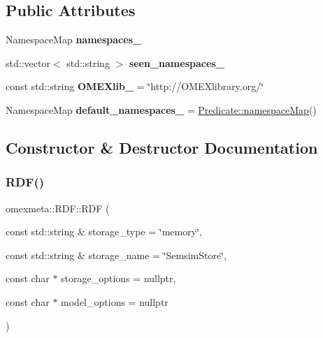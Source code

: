 \subsection*{Public Attributes}
\begin{DoxyCompactItemize}
\item 
\mbox{\label{classomexmeta_1_1RDF_a1979d7d70a4c20f2e63f00c7fa668b1f}} 
Namespace\+Map {\bfseries namespaces\+\_\+}
\item 
\mbox{\label{classomexmeta_1_1RDF_a82bc53feb93e1243970400fd104174da}} 
std\+::vector$<$ std\+::string $>$ {\bfseries seen\+\_\+namespaces\+\_\+}
\item 
\mbox{\label{classomexmeta_1_1RDF_a59014bbb45a43dbfa760480f1713c473}} 
const std\+::string {\bfseries O\+M\+E\+Xlib\+\_\+} = \char`\"{}http\+://O\+M\+E\+Xlibrary.\+org/\char`\"{}
\item 
\mbox{\label{classomexmeta_1_1RDF_a5b1184955f2401c30116c7473be1ca1d}} 
Namespace\+Map {\bfseries default\+\_\+namespaces\+\_\+} = \hyperlink{classomexmeta_1_1Predicate_a1291e3cd9727871f568e864e0f5af3f0}{Predicate\+::namespace\+Map}()
\end{DoxyCompactItemize}


\subsection{Constructor \& Destructor Documentation}
\mbox{\label{classomexmeta_1_1RDF_aecb90e51830082f78ff055c045f4b439}} 
\subsubsection{\texorpdfstring{R\+D\+F()}{RDF()}\hspace{0.1cm}{\footnotesize\ttfamily [1/2]}}
{\footnotesize\ttfamily omexmeta\+::\+R\+D\+F\+::\+R\+DF (\begin{DoxyParamCaption}\item[{const std\+::string \&}]{storage\+\_\+type = {\ttfamily \char`\"{}memory\char`\"{}},  }\item[{const std\+::string \&}]{storage\+\_\+name = {\ttfamily \char`\"{}SemsimStore\char`\"{}},  }\item[{const char $\ast$}]{storage\+\_\+options = {\ttfamily nullptr},  }\item[{const char $\ast$}]{model\+\_\+options = {\ttfamily nullptr} }\end{DoxyParamCaption})\hspace{0.3cm}{\ttfamily [explicit]}}



